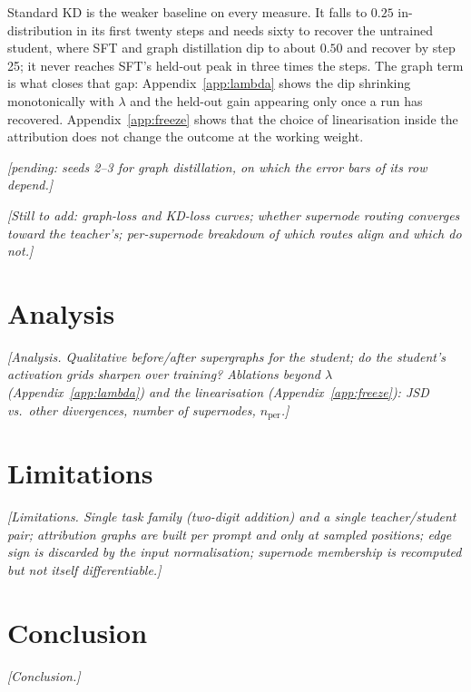 \documentclass{article}
\newcommand{\todosec}[1]{{\color{Gray}\emph{[#1]}}}
\newcommand{\pending}[1]{{\color{BurntOrange}\emph{[pending#1]}}}
\begin{document}
Standard KD is the weaker baseline on every measure. It falls to $0.25$ in-distribution in its first
twenty steps and needs sixty to recover the untrained student, where SFT and graph distillation
dip to about $0.50$ and recover by step 25; it never reaches SFT's held-out peak in three times the
steps. The graph term is what closes that gap: Appendix~\ref{app:lambda} shows the dip shrinking
monotonically with $\lambda$ and the held-out gain appearing only once a run has recovered.
Appendix~\ref{app:freeze} shows that the choice of linearisation inside the attribution does not
change the outcome at the working weight.

\pending{: seeds 2--3 for graph distillation, on which the error bars of its row depend.}

\todosec{Still to add: graph-loss and KD-loss curves; whether supernode routing converges toward
the teacher's; per-supernode breakdown of which routes align and which do not.}

\section{Analysis}
\label{sec:analysis}

\todosec{Analysis. Qualitative before/after supergraphs for the student; do the student's
activation grids sharpen over training? Ablations beyond $\lambda$ (Appendix~\ref{app:lambda})
and the linearisation (Appendix~\ref{app:freeze}): JSD vs.\ other divergences, number of
supernodes, $n_{\mathrm{per}}$.}

\section{Limitations}
\label{sec:limitations}

\todosec{Limitations. Single task family (two-digit addition) and a single teacher/student pair;
attribution graphs are built per prompt and only at sampled positions; edge sign is discarded by
the input normalisation; supernode membership is recomputed but not itself differentiable.}

\section{Conclusion}
\label{sec:conclusion}

\todosec{Conclusion.}

\end{document}
